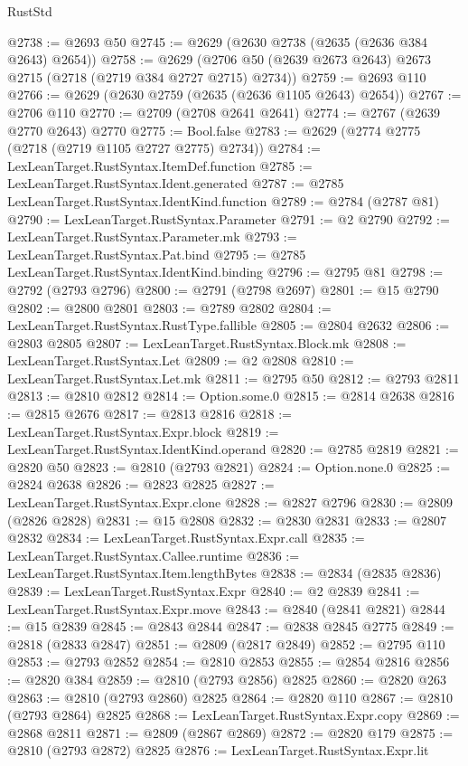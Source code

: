\begin{lexlean}{RustStd}
\begin{coremodule}
@2738 := @2693 @50
@2745 := @2629 (@2630 @2738 (@2635 (@2636 @384 @2643) @2654))
@2758 := @2629 (@2706 @50 (@2639 @2673 @2643) @2673 @2715 (@2718 (@2719 @384 @2727 @2715) @2734))
@2759 := @2693 @110
@2766 := @2629 (@2630 @2759 (@2635 (@2636 @1105 @2643) @2654))
@2767 := @2706 @110
@2770 := @2709 (@2708 @2641 @2641)
@2774 := @2767 (@2639 @2770 @2643) @2770
@2775 := Bool.false
@2783 := @2629 (@2774 @2775 (@2718 (@2719 @1105 @2727 @2775) @2734))
@2784 := LexLeanTarget.RustSyntax.ItemDef.function
@2785 := LexLeanTarget.RustSyntax.Ident.generated
@2787 := @2785 LexLeanTarget.RustSyntax.IdentKind.function
@2789 := @2784 (@2787 @81)
@2790 := LexLeanTarget.RustSyntax.Parameter
@2791 := @2 @2790
@2792 := LexLeanTarget.RustSyntax.Parameter.mk
@2793 := LexLeanTarget.RustSyntax.Pat.bind
@2795 := @2785 LexLeanTarget.RustSyntax.IdentKind.binding
@2796 := @2795 @81
@2798 := @2792 (@2793 @2796)
@2800 := @2791 (@2798 @2697)
@2801 := @15 @2790
@2802 := @2800 @2801
@2803 := @2789 @2802
@2804 := LexLeanTarget.RustSyntax.RustType.fallible
@2805 := @2804 @2632
@2806 := @2803 @2805
@2807 := LexLeanTarget.RustSyntax.Block.mk
@2808 := LexLeanTarget.RustSyntax.Let
@2809 := @2 @2808
@2810 := LexLeanTarget.RustSyntax.Let.mk
@2811 := @2795 @50
@2812 := @2793 @2811
@2813 := @2810 @2812
@2814 := Option.some.{0}
@2815 := @2814 @2638
@2816 := @2815 @2676
@2817 := @2813 @2816
@2818 := LexLeanTarget.RustSyntax.Expr.block
@2819 := LexLeanTarget.RustSyntax.IdentKind.operand
@2820 := @2785 @2819
@2821 := @2820 @50
@2823 := @2810 (@2793 @2821)
@2824 := Option.none.{0}
@2825 := @2824 @2638
@2826 := @2823 @2825
@2827 := LexLeanTarget.RustSyntax.Expr.clone
@2828 := @2827 @2796
@2830 := @2809 (@2826 @2828)
@2831 := @15 @2808
@2832 := @2830 @2831
@2833 := @2807 @2832
@2834 := LexLeanTarget.RustSyntax.Expr.call
@2835 := LexLeanTarget.RustSyntax.Callee.runtime
@2836 := LexLeanTarget.RustSyntax.Item.lengthBytes
@2838 := @2834 (@2835 @2836)
@2839 := LexLeanTarget.RustSyntax.Expr
@2840 := @2 @2839
@2841 := LexLeanTarget.RustSyntax.Expr.move
@2843 := @2840 (@2841 @2821)
@2844 := @15 @2839
@2845 := @2843 @2844
@2847 := @2838 @2845 @2775
@2849 := @2818 (@2833 @2847)
@2851 := @2809 (@2817 @2849)
@2852 := @2795 @110
@2853 := @2793 @2852
@2854 := @2810 @2853
@2855 := @2854 @2816
@2856 := @2820 @384
@2859 := @2810 (@2793 @2856) @2825
@2860 := @2820 @263
@2863 := @2810 (@2793 @2860) @2825
@2864 := @2820 @110
@2867 := @2810 (@2793 @2864) @2825
@2868 := LexLeanTarget.RustSyntax.Expr.copy
@2869 := @2868 @2811
@2871 := @2809 (@2867 @2869)
@2872 := @2820 @179
@2875 := @2810 (@2793 @2872) @2825
@2876 := LexLeanTarget.RustSyntax.Expr.lit

\end{coremodule}
\end{lexlean}

